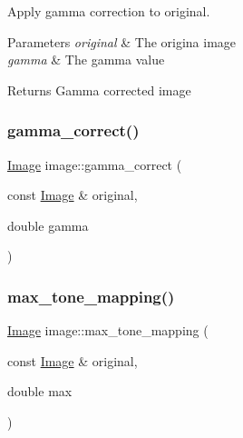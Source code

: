 Apply gamma correction to original. 


\begin{DoxyParams}{Parameters}
{\em original} & The origina image \\
\hline
{\em gamma} & The gamma value \\
\hline
\end{DoxyParams}
\begin{DoxyReturn}{Returns}
Gamma corrected image 
\end{DoxyReturn}
\mbox{\label{namespaceimage_a0d356b98f4bd21ca658d5c83e191cbe2}} 
\subsubsection{\texorpdfstring{gamma\_correct()}{gamma\_correct()}\hspace{0.1cm}{\footnotesize\ttfamily [2/2]}}
{\footnotesize\ttfamily \mbox{\hyperlink{namespaceimage_af3f0dcb372dbc1b38ba87aae9e2c780c}{Image}} image\+::gamma\+\_\+correct (\begin{DoxyParamCaption}\item[{const \mbox{\hyperlink{namespaceimage_af3f0dcb372dbc1b38ba87aae9e2c780c}{Image}} \&}]{original,  }\item[{double}]{gamma }\end{DoxyParamCaption})}

\mbox{\label{namespaceimage_a3646524ebdcbde53e3d2f4bfa47a024a}} 
\subsubsection{\texorpdfstring{max\_tone\_mapping()}{max\_tone\_mapping()}\hspace{0.1cm}{\footnotesize\ttfamily [1/2]}}
{\footnotesize\ttfamily \mbox{\hyperlink{namespaceimage_af3f0dcb372dbc1b38ba87aae9e2c780c}{Image}} image\+::max\+\_\+tone\+\_\+mapping (\begin{DoxyParamCaption}\item[{const \mbox{\hyperlink{namespaceimage_af3f0dcb372dbc1b38ba87aae9e2c780c}{Image}} \&}]{original,  }\item[{double}]{max }\end{DoxyParamCaption})}

